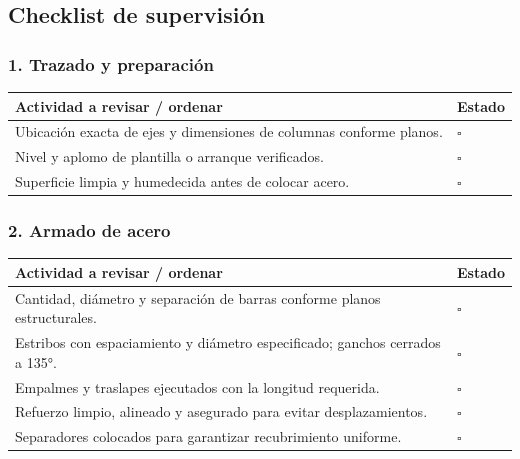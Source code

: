 \documentclass[12pt]{article}
\newcommand{\cbox}{\(\square\)} %
\begin{document}
	
	\subsection{Checklist de supervisión}
	
	\subsubsection*{1. Trazado y preparación}
	\begin{tabularx}{\linewidth}{>{\raggedright\arraybackslash}p{0.93\linewidth} >{\centering\arraybackslash}m{0.07\linewidth}}
		\toprule
		\textbf{Actividad a revisar / ordenar} & \textbf{Estado}\\
		\midrule
		Ubicación exacta de ejes y dimensiones de columnas conforme planos. & \cbox \\
		Nivel y aplomo de plantilla o arranque verificados. & \cbox \\
		Superficie limpia y humedecida antes de colocar acero. & \cbox \\
		\bottomrule
	\end{tabularx}
	
	\subsubsection*{2. Armado de acero}
	\begin{tabularx}{\linewidth}{>{\raggedright\arraybackslash}p{0.93\linewidth} >{\centering\arraybackslash}m{0.07\linewidth}}
		\toprule
		\textbf{Actividad a revisar / ordenar} & \textbf{Estado}\\
		\midrule
		Cantidad, diámetro y separación de barras conforme planos estructurales. & \cbox \\
		Estribos con espaciamiento y diámetro especificado; ganchos cerrados a 135°. & \cbox \\
		Empalmes y traslapes ejecutados con la longitud requerida. & \cbox \\
		Refuerzo limpio, alineado y asegurado para evitar desplazamientos. & \cbox \\
		Separadores colocados para garantizar recubrimiento uniforme. & \cbox \\
		\bottomrule
	\end{tabularx}
	
\end{document}
